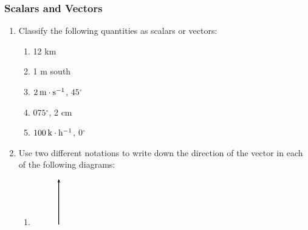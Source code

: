             \subsubsection{  Scalars and Vectors }
            \nopagebreak
            
        \label{m38812*id187475}\begin{enumerate}[noitemsep, label=\textbf{\arabic*}. ] 
            \label{m38812*uid8}\item Classify the following quantities as scalars or vectors:
\label{m38812*id187490}\begin{enumerate}[noitemsep, label=\textbf{\alph*}. ] 
            \label{m38812*uid9}\item 12 km
\label{m38812*uid10}\item 1 m south
\label{m38812*uid11}\item \begin{math}2\phantom{\rule{2pt}{0ex}}\mathrm{m}\ensuremath{\cdot}{\mathrm{s}}^{-1}\end{math}, \begin{math}45{}^{\circ }\end{math}\label{m38812*uid12}\item \begin{math}075{}^{\circ }\end{math}, 2 cm
\label{m38812*uid13}\item \begin{math}100\phantom{\rule{2pt}{0ex}}\mathrm{k}\ensuremath{\cdot}{\mathrm{h}}^{-1}\end{math}, \begin{math}0{}^{\circ }\end{math}\end{enumerate}
                \label{m38812*uid14}\item Use two different notations to write down the direction of the vector in each of the following diagrams:
\label{m38812*id187643}\begin{enumerate}[noitemsep, label=\textbf{\alph*}. ] 
            \label{m38812*uid15}\item 
    \setcounter{subfigure}{0}


	\begin{figure}[H] %
    \begin{center}
    \label{m38812*id187654!!!underscore!!!media}\label{m38812*id187654!!!underscore!!!printimage}\includegraphics[height=2cm]{col11305.imgs/m38812_PG11C1_007.png} %
        

\end{center}
\end{figure}
\end{enumerate}
\end{enumerate}
